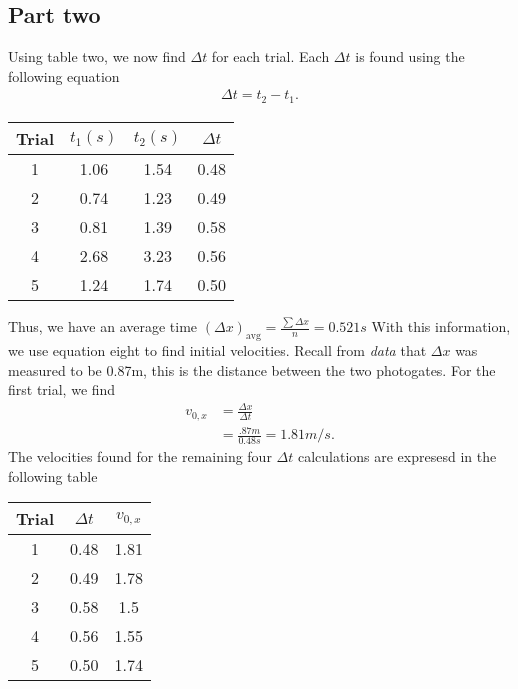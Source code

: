\documentclass{report}
\begin{document}
    \subsection{Part two}
    \bigbreak \noindent 
    Using table two, we now find $\Delta t$ for each trial. Each $\Delta t$ is found using the following equation
    \begin{align*}
        \Delta t = t_{2} - t_{1}
    .\end{align*}
    \bigbreak \noindent 
    \begin{center}
        \begin{tabular}{c|c|c|c}
            Trial & $t_{1} (s)$ & $t_{2} (s) $ & $\Delta t$ \\
            \hline
            1 & 1.06 & 1.54 &0.48 \\ 
            2 & 0.74& 1.23 & 0.49\\
            3 & 0.81 & 1.39 &0.58\\
            4 & 2.68 & 3.23 & 0.56\\
            5 & 1.24 & 1.74 & 0.50
        \end{tabular}
    \end{center}
    \bigbreak \noindent 
    Thus, we have an average time $(\Delta x)_{\text{avg}} = \frac{\sum \Delta x}{n} = 0.521s$ 
    \bigbreak \noindent 
    With this information, we use equation eight to find initial velocities. Recall from \textit{data} that $\Delta x$ was measured to be 0.87m, this is the distance between the two photogates. For the first trial, we find
    \begin{align*}
        v_{0,x} &= \frac{\Delta x}{\Delta t}\\
        &=\frac{.87m}{0.48s} = 1.81 m/s
    .\end{align*}
    \bigbreak \noindent 
    The velocities found for the remaining four $\Delta t$ calculations are expresesd in the following table
    \bigbreak \noindent 
    \begin{center}
        \begin{tabular}{c|c|c}
            Trial & $\Delta t$ & $v_{0,x}$\\
        \hline
            1 & 0.48 & 1.81\\
            2 & 0.49 & 1.78\\
            3 & 0.58 & 1.5\\
            4  & 0.56 & 1.55\\
            5 & 0.50 & 1.74
        \end{tabular}
    \end{center}
\end{document}
